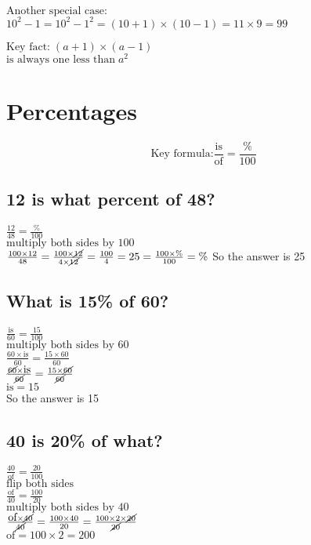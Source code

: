 \documentclass[fullpage,twocolumn]{article}
\begin{document}
$\mbox{Another special case:}\;$\\
$10^2 - 1 = 10^2 - 1^2 = (10+1) \times (10-1) = 11 \times 9 = 99$

$\mbox{Key fact:}\;   (a+1) \times (a-1) \;$ \\
$\mbox{is always one less than} \; a^2$

\section{Percentages}

\[
\mbox{Key formula:} \frac{\mbox{is}}{\mbox{of}} = \frac{\%}{100}
\]

\subsection{12 is what percent of 48?}

${\frac{12}{48} = \frac{\%}{100}} $\\
${\mbox{multiply both sides by 100}} $\\
${\frac{100 \times 12 }{48} = \frac{100 \times \cancel{12}}{4 \times \cancel{12}} = \frac{100}{4} = 25 = \frac{100 \times \% }{100} = \%}$
So the answer is 25

\subsection{What is 15\% of 60?}

${\frac{\mbox{is}}{60} = \frac{15}{100} }$ \\
${\mbox{multiply both sides by 60} }$ \\
${\frac{60 \times \mbox{is} }{60 } = \frac{ 15  \times 60}{60}}$ \\
${\frac{\cancel{60} \times \mbox{is} }{\cancel{60} } = \frac{ 15  \times \cancel{60}}{\cancel{60}}}$ \\
 ${\mbox{is} = 15} $ \\
So the answer is 15

\subsection{40 is 20\% of what?}

${\frac{40}{\mbox{of}} = \frac{20}{100}}$  \\
${\mbox{flip both sides} }$ \\
${\frac{\mbox{of}}{40} = \frac{100}{20}}$  \\
${\mbox{multiply both sides by 40}} $ \\
${\frac{\mbox{of} \times \cancel{40}}{\cancel{40}} = \frac{100 \times 40}{20} = \frac{100 \times 2 \times \cancel{20}}{\cancel{20}}} $ \\
${\mbox{of} = 100 \times 2 = 200} $
\end{document}
